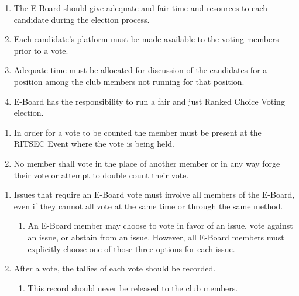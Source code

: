 


\begin{enumerate}
  \item The E-Board should give adequate and fair time and resources to each
    candidate during the election process.
  \item Each candidate's platform must be made available to the voting members
    prior to a vote.
  \item Adequate time must be allocated for discussion of the candidates for a
    position among the club members not running for that position.
  \item E-Board has the responsibility to run a fair and just Ranked Choice
    Voting election.
\end{enumerate}


\begin{enumerate}
  \item In order for a vote to be counted the member must be present at the
    RITSEC Event where the vote is being held.
  \item No member shall vote in the place of another member or in any way forge
    their vote or attempt to double count their vote.
\end{enumerate}


\begin{enumerate}
  \item Issues that require an E-Board vote must involve all members of the
    E-Board, even if they cannot all vote at the same time or through the same
    method.
  \begin{enumerate}
    \item An E-Board member may choose to vote in favor of an issue, vote
      against an issue, or abstain from an issue.  However, all E-Board members
      must explicitly choose one of those three options for each issue.
  \end{enumerate}
  \item After a vote, the tallies of each vote should be recorded.
  \begin{enumerate}
    \item This record should never be released to the club members.
  \end{enumerate}
\end{enumerate}